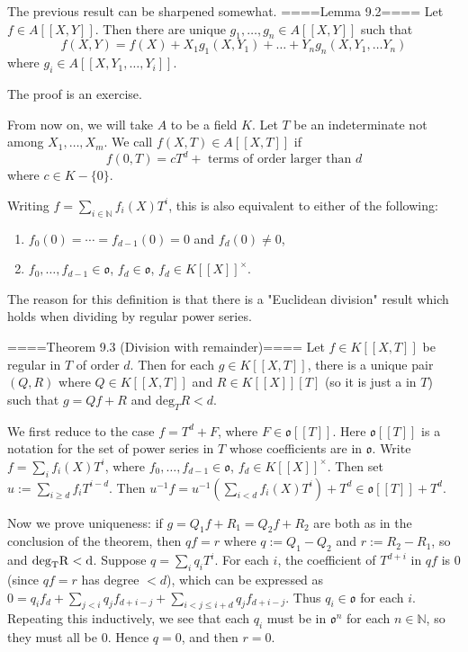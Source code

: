 The previous result can be sharpened somewhat.
====Lemma 9.2==== Let $f\in A[[X,Y]]$. Then there are unique $g_1,\ldots, g_n\in A[[X,Y]]$ such that
$$f(X,Y)=f(X)+X_1 g_1(X, Y_1)+\ldots + Y_n g_n(X, Y_1,\ldots Y_n)$$
where $g_i\in A[[X,Y_1,\ldots, Y_i]]$. 

The proof is an exercise.

From now on, we will take $A$ to be a field $K$. Let $T$ be an indeterminate not among $X_1,\ldots, X_m$. We call $f(X,T)\in A[[X,T]]$  if 
$$f(0,T)=cT^d+\textrm{ terms of order larger than }d$$
where $c\in K-\{0\}$.

Writing $f=\sum_{i\in\mathbb{N}} f_i(X)T^i$, this is also equivalent to either of the following:
\begin{enumerate}
  \item  $f_0(0)=\cdots =f_{d-1}(0)=0$ and $f_d(0)\neq 0$,
  \item  $f_0,\ldots, f_{d-1}\in \mathfrak{o}$, $f_d\in \mathfrak{o}$, $f_d\in K[[X]]^\times$.
\end{enumerate}

The reason for this definition is that there is a "Euclidean division" result which holds when dividing by regular power series.

====Theorem 9.3 (Division with remainder)====
Let $f\in K[[X,T]]$ be regular in $T$ of order $d$. Then for each $g\in K[[X,T]]$, there is a unique pair $(Q,R)$ where $Q\in K[[X,T]]$ and $R\in K[[X]][T]$ (so it is just a  in $T$) such that $g=Qf+R$ and $\mathrm{deg}_TR<d$.


We first reduce to the case $f=T^d+F$, where $F\in\mathfrak{o}[[T]]$. Here $\mathfrak{o}[[T]]$ is a notation for the set of power series in $T$ whose coefficients are in $\mathfrak{o}$. Write $f=\sum_i f_i(X) T^i$, where $f_0,\ldots, f_{d-1}\in\mathfrak{o}$, $f_d\in K[[X]]^\times$. Then set $u:=\sum_{i\ge d} f_i T^{i-d}$. Then $u^{-1}f= u^{-1}(\sum_{i<d} f_i(X)T^i)+T^d\in \mathfrak{o}[[T]]+T^d$.

Now we prove uniqueness: if $g=Q_1f+R_1=Q_2f+R_2$ are both as in the conclusion of the theorem, then $qf=r$ where $q:=Q_1-Q_2$ and $r:=R_2-R_1$, so and $\rm{deg}_TR<d$. Suppose $q=\sum_i q_i T^i$. For each $i$, the coefficient of $T^{d+i}$ in $qf$ is 0 (since $qf=r$ has degree $<d$), which can be expressed as $0=q_if_d+\sum_{j<i}q_jf_{d+i-j}+\sum_{i<j\le i+d}q_jf_{d+i-j}$. Thus $q_i\in \mathfrak{o}$ for each $i$. Repeating this inductively, we see that each $q_i$ must be in $\mathfrak{o}^n$ for each $n\in \mathbb{N}$, so they must all be $0$. Hence $q=0$, and then $r=0$.

